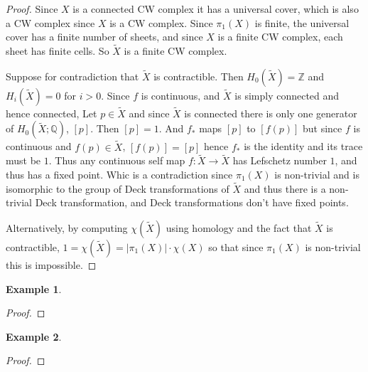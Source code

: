 \documentclass[a4paper]{article}
\theoremstyle{theorem}
\theoremstyle{definition}
\newtheorem{example}{Example}
\theoremstyle{remark}
\theoremstyle{gremark}
\theoremstyle{discussion}
\theoremstyle{notation}
\begin{document}
\begin{proof}
	Since $X$ is a connected CW complex it has a universal cover, which is also a CW complex since $X$ is a CW complex. Since $\pi_1(X)$ is finite, the universal cover has a finite number of sheets, and since $X$ is a finite CW complex, each sheet has finite cells. So $\widetilde{X}$ is a finite CW complex. 
	\medbreak
	
	Suppose for contradiction that $\widetilde{X}$ is contractible. Then $H_0(\widetilde{X})=\mathbb{Z}$ and $H_i(\widetilde{X})=0$ for $i>0$. Since $f$ is continuous, and $\widetilde{X}$ is simply connected and hence connected,
	Let $p\in \widetilde{X}$ and since $\widetilde{X}$ is connected there is only one generator of $H_0(\widetilde{X};\mathbb{Q}) $, $[p]$. Then $[p]=1$. And $f_*$ maps $[p]$ to $[f(p)]$ but since $f$ is continuous and $f(p)\in\widetilde{X}$, $[f(p)]=[p]$ hence $f_*$ is the identity and its trace must be $1$.  	
	Thus any continuous self map $f:\widetilde{X}\to\widetilde{X}$ has Lefschetz number $1$, and thus has a fixed point.  
	Whic is a contradiction since $\pi_1(X)$ is non-trivial and is isomorphic to the group of Deck transformations of $\widetilde{X}$ and thus there is a non-trivial Deck transformation, and Deck transformations don't have fixed points. 
	
	Alternatively, by computing $\chi(\widetilde{X})$ using homology and the fact that $\widetilde{X}$ is contractible, $1=\chi(\widetilde{X})=|\pi_1(X)|\cdot \chi(X)$ so that since $\pi_1(X)$ is non-trivial this is impossible.
\end{proof}


\begin{example}
	
\end{example}

\begin{proof}
	
\end{proof}

\begin{example}
	
\end{example}

\begin{proof}
	
\end{proof}


	
	
\end{document}
